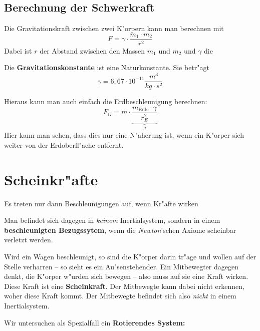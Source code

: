 \subsection{Berechnung der Schwerkraft}
\label{kap_scherkraft_berechnung}


Die Gravitationskraft zwischen zwei K"orpern kann man berechnen mit 
\begin{equation}
   \label{eqn_gravitation}
   \boxed{
      F = \gamma \cdot \frac{m_1 \cdot m_2}{r^2}
   }
\end{equation}
Dabei ist $r$ der Abstand zwischen den Massen $m_1$ und $m_2$ und $\gamma$ die
\begin{Def}
\label{def_gravitationskonstante}
   Die \textbf{Gravitationskonstante} ist eine Naturkonstante. Sie
   betr"agt
$$
 \gamma = 6,67 \cdot 10^{-11} \frac{m^3}{kg \cdot s^2}
$$
\end{Def}
Hieraus kann man auch einfach die Erdbeschleunigung berechnen:
$$
  F_G = m \cdot \underbrace{\frac{m_\text{Erde} \cdot \gamma}{r_E^2}}_g
$$
Hier kann man sehen, dass dies nur eine N"aherung ist, wenn
ein K"orper sich weiter von der Erdoberfl"ache entfernt.



\section{Scheinkr"afte}
\label{kap_scheinkraefte}

\begin{Def}[Inertialsystem]
\label{def_inertialsystem}
Es treten nur dann Beschleunigungen auf, wenn Kr"afte wirken
\end{Def}

Man befindet sich dagegen in \emph{keinem} Inertialsystem, sondern in
einem \textbf{beschleunigten Bezugssytem}, wenn die
\emph{Newton}'schen Axiome scheinbar verletzt werden. 

Wird ein Wagen beschleunigt, so sind die K"orper darin tr"age und wollen
auf der Stelle verharren -- so sieht es ein Au"senstehender. Ein
Mitbewegter dagegen denkt, die K"orper w"urden sich bewegen -- also muss
auf sie eine Kraft wirken. Diese Kraft ist eine
\textbf{Scheinkraft}. Der Mitbewegte kann dabei nicht erkennen, woher
diese Kraft kommt. Der Mitbewegte befindet sich also \emph{nicht} in
einem Inertialsystem.


\abs
Wir untersuchen als Spezialfall ein \textbf{Rotierendes System:}

